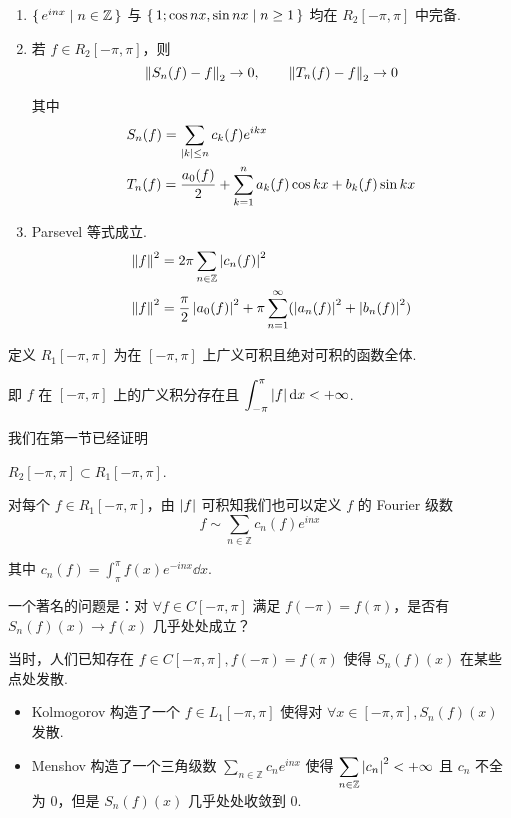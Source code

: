 \begin{theorem}
    \begin{enumerate}
        \item $\set{e^{inx}|n\in\mathbb{Z}}$ 与 $\set{1;\cos nx,\sin nx|n\ge 1}$ 均在 $R_2[-\pi,\pi]$ 中完备.
        
        \item 若 $f\in R_2[-\pi,\pi]$，则
$$
\left\lVert{S_n(f)-f}\right\rVert_2\to 0,\qquad\left\lVert{T_n(f)-f}\right\rVert_2\to 0
$$

        其中
$$
\begin{aligned}
    &S_n(f)=\sum_{\left\lvert{k}\right\rvert\le n}c_k(f)e^{ikx}\\
    &T_n(f)=\frac{a_0(f)}{2}+\sum_{k=1}^na_k(f)\cos kx+b_k(f)\sin kx
\end{aligned}
$$

        \item Parsevel 等式成立.
$$
\begin{aligned}
    \left\lVert{f}\right\rVert^2&=2\pi\sum_{n\in\mathbb{Z}}\left\lvert{c_n(f)}\right\rvert^2\\
    \left\lVert{f}\right\rVert^2&=\frac{\pi}{2}\left\lvert{a_0(f)}\right\rvert^2+\pi\sum_{n=1}^\infty(\left\lvert{a_n(f)}\right\rvert^2+\left\lvert{b_n(f)}\right\rvert^2)
\end{aligned}
$$
    \end{enumerate}
\end{theorem}



定义 $R_1[-\pi,\pi]$ 为在 $[-\pi,\pi]$ 上广义可积且绝对可积的函数全体.

即 $f$ 在 $[-\pi,\pi]$ 上的广义积分存在且 $\displaystyle\int_{-\pi}^{\pi}\left\lvert{f}\right\rvert\mathrm{d} x<+\infty$.

我们在第一节已经证明

\begin{property}
    $R_2[-\pi,\pi]\subset R_1[-\pi,\pi]$.
\end{property}

对每个 $f\in R_1[-\pi,\pi]$，由 $\left\lvert{f}\right\rvert$ 可积知我们也可以定义 $f$ 的 Fourier 级数
$$
f\sim\sum_{n\in\mathbb{Z}}c_n(f)e^{inx}
$$

其中 $c_n(f)=\displaystyle\int_{\pi}^{\pi}f(x)e^{-inx}\dd x$.

一个著名的问题是：对 $\forall f\in C[-\pi,\pi]$ 满足 $f(-\pi)=f(\pi)$，是否有 $S_n(f)(x)\to f(x)$ 几乎处处成立？

当时，人们已知存在 $f\in C[-\pi,\pi],f(-\pi)=f(\pi)$ 使得 $S_n(f)(x)$ 在某些点处发散.

\begin{itemize}
    \item Kolmogorov  构造了一个 $f\in L_1[-\pi,\pi]$ 使得对 $\forall x\in[-\pi,\pi],S_n(f)(x)$ 发散.
    
    \item Menshov 构造了一个三角级数 $\displaystyle\sum_{n\in\mathbb{Z}}c_ne^{inx}$ 使得 $\displaystyle\sum_{n\in\mathbb{Z}}\left\lvert{c_n}\right\rvert^2<+\infty$ 且 $c_n$ 不全为 $0$，但是 $S_n(f)(x)$ 几乎处处收敛到 $0$.
\end{itemize}

